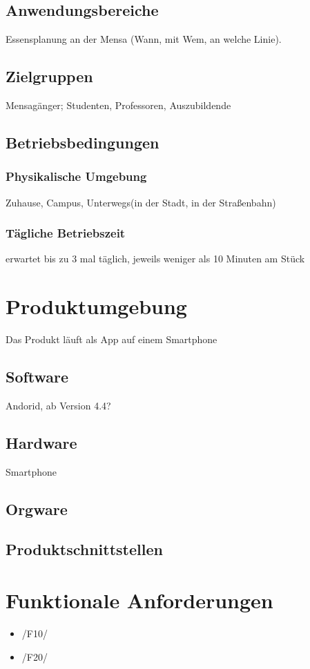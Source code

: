 \documentclass[a4paper]{scrreprt}
\begin{document}
 
\section{Anwendungsbereiche}
Essensplanung an der Mensa (Wann, mit Wem, an welche Linie).
 
\section{Zielgruppen}
Mensagänger; Studenten, Professoren, Auszubildende 
 
\section{Betriebsbedingungen}
\subsection{Physikalische Umgebung}
Zuhause, Campus, Unterwegs(in der Stadt, in der Straßenbahn)

\subsection{Tägliche Betriebszeit}
erwartet bis zu 3 mal täglich, jeweils weniger als 10 Minuten am Stück 
 
\chapter{Produktumgebung}
Das Produkt läuft als App auf einem Smartphone

\section{Software}
Andorid, ab Version 4.4?
 
\section{Hardware}
Smartphone 
 
\section{Orgware}

\section{Produktschnittstellen} 
 
\chapter{Funktionale Anforderungen}
\begin{itemize}
\item /F10/ 
\item /F20/

\end{itemize}
 
\end{document}
